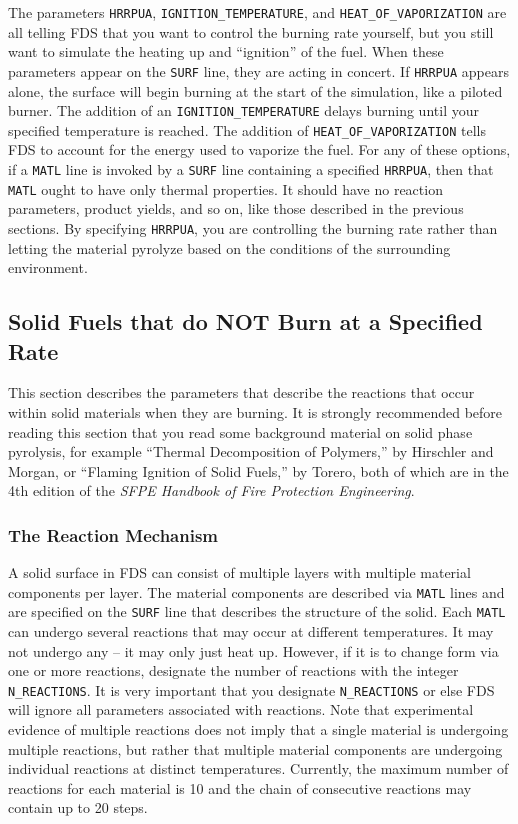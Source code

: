 \documentclass[11pt]{book}
\newcommand{\ct}{\tt\small}
\begin{document}
\noindent
The parameters {\ct HRRPUA}, {\ct IGNITION\_TEMPERATURE}, and {\ct HEAT\_OF\_VAPORIZATION} are all telling FDS that you want to control the
burning rate yourself, but you still want to simulate the heating up and ``ignition'' of the fuel. When these parameters appear on the {\ct SURF} line, they
are acting in concert. If {\ct HRRPUA} appears alone, the surface will begin burning at the start of the simulation, like a piloted burner. The addition of
an {\ct IGNITION\_TEMPERATURE} delays burning until your specified temperature is reached. The addition of {\ct HEAT\_OF\_VAPORIZATION}
tells FDS to account for the energy used to vaporize the fuel. For any of these options, if a {\ct MATL} line is invoked by a {\ct SURF} line containing
a specified {\ct HRRPUA}, then that {\ct MATL} ought to have only thermal properties. It should have no reaction parameters, product yields, and so on, like
those described in the previous sections. By specifying {\ct HRRPUA}, you are controlling the burning rate rather than letting the material pyrolyze based on
the conditions of the surrounding environment.






\subsection{Solid Fuels that do NOT Burn at a Specified Rate}
\label{info:solid_pyrolysis}

This section describes the parameters that describe the reactions that occur within solid
materials when they are burning. It is strongly recommended before reading this section that you read some background material on
solid phase pyrolysis, for example ``Thermal Decomposition of Polymers,'' by Hirschler and Morgan, or
``Flaming Ignition of Solid Fuels,'' by Torero, both of which are in the 4th edition of the
{\em SFPE Handbook of Fire Protection Engineering}.

\subsubsection{The Reaction Mechanism}

A solid surface in FDS can consist of multiple layers with multiple material
components per layer. The material components are described via {\ct MATL} lines and are specified on the {\ct SURF}
line that describes the structure of the solid.  Each {\ct MATL} can undergo several reactions that may
occur at different temperatures. It may not undergo any -- it may only just heat
up. However, if it is to change form via one or more reactions,
designate the number of reactions with the integer {\ct N\_REACTIONS}. It is very important that you designate {\ct N\_REACTIONS}
or else FDS will ignore all parameters associated with
reactions. Note that experimental evidence of multiple
reactions does not imply that a single material is undergoing multiple reactions, but rather that
multiple material components are undergoing individual reactions at distinct temperatures.  Currently, the maximum number of
reactions for each material is 10 and the chain of consecutive
reactions may contain up to 20 steps.
\end{document}
